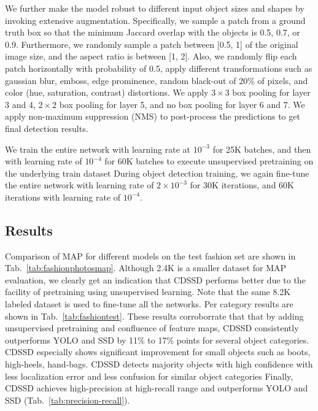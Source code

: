 \documentclass[sigconf]{acmart}
\begin{document}
We further make the model robust to different input object sizes and
shapes by invoking extensive augmentation.
Specifically, we sample a patch from a ground truth box so that the
minimum Jaccard overlap with the objects is 0.5, 0.7, or 0.9.
Furthermore, we randomly sample a patch between
[0.5, 1] of the original image size, and the aspect ratio
is between [1, 2].
Also, we randomly flip each patch horizontally with
probability of 0.5, apply different transformations such
as gaussian blur, emboss, edge prominence, random black-out of
20\% of pixels, and color (hue, saturation, contrast) distortions.
We apply $3 \times 3$ box pooling for layer 3 and 4, $2 \times 2$ box pooling
for layer 5, and no box pooling for layer 6 and 7.
We apply non-maximum suppression (NMS) 
to post-process the predictions to get final detection results.  


We train the entire network with learning rate at
$10^{-3}$ for 25K batches, and then
with learning rate of $10^{-4}$ for 60K batches to execute
unsupervised pretraining on the underlying train dataset
During object detection training,
we again fine-tune the entire network
with learning rate of $2 \times 10^{-3}$
for 30K iterations, and 60K iterations
with learning rate of $10^{-4}$.

\subsection{Results}
Comparison of MAP for different models
on the test fashion set are shown
in Tab.~\ref{tab:fashionphotosmap}.
Although 2.4K is a smaller dataset
for MAP evaluation, we clearly
get an indication that CDSSD performs
better due to the facility of pretraining
using unsupervised learning.
Note that the same 8.2K labeled dataset
is used to fine-tune all the networks.
Per category results 
are shown in Tab.~\ref{tab:fashiontest}.
These results corroborrate that
that by adding unsupervised pretraining
and confluence of feature maps, CDSSD
consistently outperforms YOLO and SSD
by 11\% to 17\% points
for several object categories.
CDSSD especially shows significant improvement
for small objects such as boots, high-heels, hand-bags.
CDSSD detects majority objects with high confidence
with less localization error and
less confusion for similar object categories
Finally, CDSSD achieves high-precision at high-recall range 
and outperforms YOLO and SSD (Tab.~\ref{tab:precision-recall}).
\end{document}
